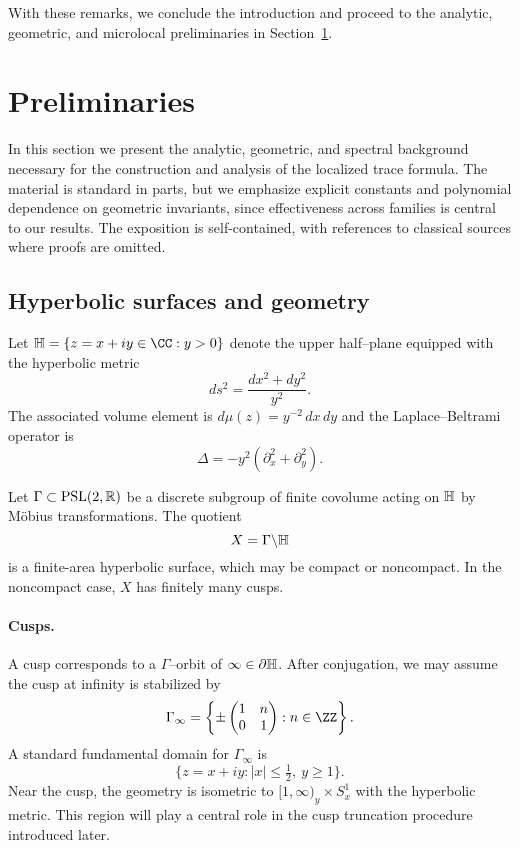 With these remarks, we conclude the introduction and proceed to the analytic,
geometric, and microlocal preliminaries in Section~\ref{sec:preliminaries}.

\section{Preliminaries}\label{sec:preliminaries}

In this section we present the analytic, geometric, and spectral background necessary
for the construction and analysis of the localized trace formula. The material is
standard in parts, but we emphasize explicit constants and polynomial dependence on
geometric invariants, since effectiveness across families is central to our results.
The exposition is self-contained, with references to classical sources where proofs are
omitted.

\subsection{Hyperbolic surfaces and geometry}\label{subsec:hyperbolic-geometry}

Let $\HH = \{ z = x+iy \in \CC : y > 0 \}$ denote the upper half–plane equipped with
the hyperbolic metric
\[
  ds^2 = \frac{dx^2+dy^2}{y^2}.
\]
The associated volume element is $d\mu(z) = y^{-2}\,dx\,dy$ and the Laplace–Beltrami
operator is
\[
  \Delta = -y^2(\partial_x^2 + \partial_y^2).
\]

Let $\Gamma \subset \mathrm{PSL}(2,\mathbb{R})$ be a discrete subgroup of finite covolume acting on
$\mathbb{H}$ by Möbius transformations. The quotient
\[
  X = \Gamma \backslash \mathbb{H}
\]
is a finite-area hyperbolic surface, which may be compact or noncompact. In the
noncompact case, $X$ has finitely many cusps.

\paragraph{Cusps.}
A cusp corresponds to a $\Gamma$–orbit of $\infty \in \partial \mathbb{H}$. After conjugation,
we may assume the cusp at infinity is stabilized by
\[
  \Gamma_\infty = \left\{ \pm \begin{pmatrix} 1 & n \\ 0 & 1 \end{pmatrix} : n \in \ZZ \right\}.
\]
A standard fundamental domain for $\Gamma_\infty$ is
\[
  \{ z = x+iy : |x| \leq \tfrac{1}{2},\ y \geq 1 \}.
\]
Near the cusp, the geometry is isometric to $[1,\infty)_y \times S^1_x$ with the
hyperbolic metric. This region will play a central role in the cusp truncation
procedure introduced later.

